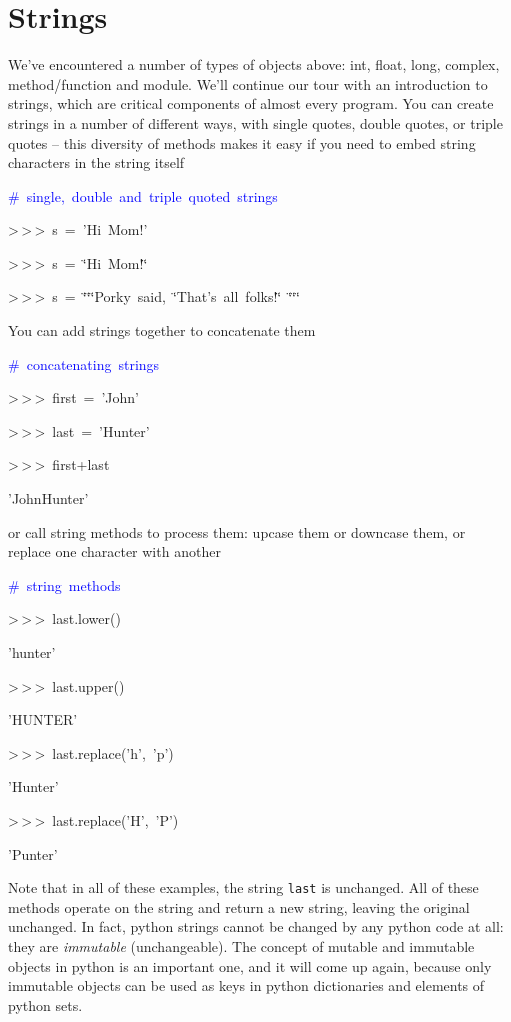 \section{\label{sec:intro_string}Strings}

We've encountered a number of types of objects above: int, float,
long, complex, method/function and module. We'll continue our tour
with an introduction to strings, which are critical components of
almost every program. You can create strings in a number of different
ways, with single quotes, double quotes, or triple quotes -- this
diversity of methods makes it easy if you need to embed string characters
in the string itself

\begin{lyxcode}
\textcolor{blue}{\#~single,~double~and~triple~quoted~strings}

>\,{}>\,{}>~s~=~'Hi~Mom!'

>\,{}>\,{}>~s~=~\char`\"{}Hi~Mom!\char`\"{}

>\,{}>\,{}>~s~=~\char`\"{}\char`\"{}\char`\"{}Porky~said,~\char`\"{}That's~all~folks!\char`\"{}~\char`\"{}\char`\"{}\char`\"{}
\end{lyxcode}
You can add strings together to concatenate them

\begin{lyxcode}
\textcolor{blue}{\#~concatenating~strings}

>\,{}>\,{}>~first~=~'John'

>\,{}>\,{}>~last~=~'Hunter'

>\,{}>\,{}>~first+last

'JohnHunter'
\end{lyxcode}
or call string methods to process them: upcase them or downcase them,
or replace one character with another

\begin{lyxcode}
\textcolor{blue}{\#~string~methods}

>\,{}>\,{}>~last.lower()

'hunter'

>\,{}>\,{}>~last.upper()

'HUNTER'

>\,{}>\,{}>~last.replace('h',~'p')

'Hunter'

>\,{}>\,{}>~last.replace('H',~'P')

'Punter'~
\end{lyxcode}
Note that in all of these examples, the string \texttt{last} is unchanged.
All of these methods operate on the string and return a new string,
leaving the original unchanged. In fact, python strings cannot be
changed by any python code at all: they are \textit{immutable} (unchangeable).
The concept of mutable and immutable objects in python is an important
one, and it will come up again, because only immutable objects can
be used as keys in python dictionaries and elements of python sets.

